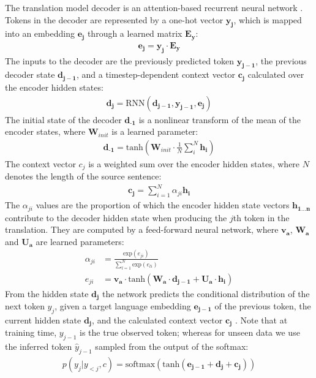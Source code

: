 The translation model decoder is an attention-based recurrent neural network \cite{Bahdanau2015}. Tokens in the decoder are 
represented by a one-hot vector $\mathbf{y_j}$, which is mapped into an embedding  $\mathbf{e_j}$ through a learned matrix $\mathbf{E_y}$:
%
\begin{align}
	\mathbf{e_j} = \mathbf{y_j} \cdot \mathbf{E_y} 
\end{align}
%
The inputs to the decoder are the previously predicted token $\mathbf{y_{j-1}}$, the previous decoder state $\mathbf{d_{j-1}}$, 
and a timestep-dependent context vector $\mathbf{c_j}$ calculated over the encoder hidden states:
%
\begin{align}
    \mathbf{d_j} = \text{RNN}(\mathbf{d_{j-1}}, \mathbf{y_{j-1}},
    \mathbf{e_j})
\end{align}
%
The initial state of the decoder $\mathbf{d_{\text{-1}}}$ is a nonlinear transform of the mean of the encoder states, where $\mathbf{W}_{init}$ is a learned parameter:
%
\begin{align}
	\mathbf{d_{\text{-1}}} = \text{tanh}(\mathbf{W}_{init} \cdot \frac{1}{N} \sum_{i}^{N}
    \mathbf{h_i})\label{eqn:decoder_init}
\end{align}
%
The context vector $c_j$ is a weighted sum over the encoder hidden states, where $N$ denotes the length of the source sentence:
\begin{align}
	\mathbf{c_j} = \sum_{i=1}^{N} \alpha_{ji}\mathbf{h_i} 
\end{align}
%
The $\alpha_{ji}$ values are the proportion of which the encoder hidden state vectors $\mathbf{ h_{1 \ldots n}}$ contribute to the decoder hidden state 
when producing the $j$th token in the translation. They are computed by a feed-forward neural network, where $\mathbf{v_a}$, 
$\mathbf{W_a}$ and $\mathbf{U_a}$ are learned parameters:
%
\begin{align}
	\alpha_{ji} &= \frac{\text{exp}(e_{ji})}{\sum_{l=1}^{N} \text{exp}(e_{li})}\\[1ex]
	e_{ji} &= \mathbf{v_a} \cdot \text{tanh}( \mathbf{W_{a}} \cdot \mathbf{d_{j-1}}  + \mathbf{U_{a}}  \cdot \mathbf{h_i} )
\end{align}
%
From the hidden state $\mathbf{d_{j}}$ the network predicts the conditional distribution of the next token $y_{j}$, given a target 
language embedding $\mathbf{e_{j-1}}$ of the previous token, the current hidden state $\mathbf{d_j}$, and the calculated context vector 
$\mathbf{c_j}$ . Note that at training time, $y_{j-1}$ is the 
true observed token; whereas for unseen data we use the inferred token $\hat{y}_{j-1}$ sampled from the output of the softmax:
%
\begin{align}
p(y_{j}|y_{<j}, c) = \text{softmax}(\text{tanh}( \mathbf{e_{j-1}}  + \mathbf{d_j}  + \mathbf{c_j} ))
\end{align}


